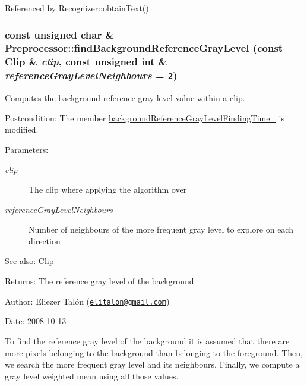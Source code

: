 Referenced by Recognizer::obtainText().\hypertarget{class_preprocessor_a941f81382bd8e235e4dd12481342be4}{
\subsubsection[findBackgroundReferenceGrayLevel]{\setlength{\rightskip}{0pt plus 5cm}const unsigned char \& Preprocessor::findBackgroundReferenceGrayLevel (const {\bf Clip} \& {\em clip}, \/  const unsigned int \& {\em referenceGrayLevelNeighbours} = {\tt 2})}}
\label{class_preprocessor_a941f81382bd8e235e4dd12481342be4}


Computes the background reference gray level value within a clip. 

\begin{Desc}
\item[Postcondition:]The member \hyperlink{class_preprocessor_140ea3fa7bbd4e8fef54912d65c4e926}{backgroundReferenceGrayLevelFindingTime\_\-} is modified.\end{Desc}
\begin{Desc}
\item[Parameters:]
\begin{description}
\item[{\em clip}]The clip where applying the algorithm over \item[{\em referenceGrayLevelNeighbours}]Number of neighbours of the more frequent gray level to explore on each direction\end{description}
\end{Desc}
\begin{Desc}
\item[See also:]\hyperlink{class_clip}{Clip}\end{Desc}
\begin{Desc}
\item[Returns:]The reference gray level of the background\end{Desc}
\begin{Desc}
\item[Author:]Eliezer Talón (\href{mailto:elitalon@gmail.com}{\tt elitalon@gmail.com}) \end{Desc}
\begin{Desc}
\item[Date:]2008-10-13\end{Desc}
To find the reference gray level of the background it is assumed that there are more pixels belonging to the background than belonging to the foreground. Then, we search the more frequent gray level and its neighbours. Finally, we compute a gray level weighted mean using all those values.

